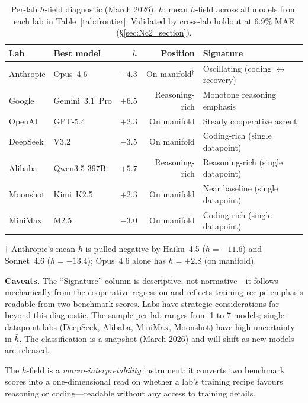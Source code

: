 \documentclass[11pt]{article}
\begin{document}
\begin{table}[ht]
\centering\small
\caption{Per-lab $h$-field diagnostic (March 2026).
$\bar{h}$: mean $h$-field across all models from each lab in Table~\ref{tab:frontier}. Validated by cross-lab holdout at 6.9\% MAE (\S\ref{sec:Nc2_section}).}
\label{tab:lab_diagnostic}
\begin{tabular}{llrrl}
\toprule
Lab & Best model & $\bar{h}$ & Position & Signature \\
\midrule
Anthropic & Opus~4.6     & $-4.3$  & On manifold$^\dagger$     & Oscillating (coding $\leftrightarrow$ recovery) \\
Google    & Gemini~3.1~Pro & $+6.5$ & Reasoning-rich  & Monotone reasoning emphasis \\
OpenAI    & GPT-5.4      & $+2.3$  & On manifold     & Steady cooperative ascent \\
DeepSeek  & V3.2         & $-3.5$  & On manifold     & Coding-rich (single datapoint) \\
Alibaba   & Qwen3.5-397B & $+5.7$  & Reasoning-rich  & Reasoning-rich (single datapoint) \\
Moonshot  & Kimi~K2.5    & $+2.3$  & On manifold     & Near baseline (single datapoint) \\
MiniMax   & M2.5         & $-3.0$  & On manifold     & Coding-rich (single datapoint) \\
\bottomrule
\end{tabular}
\end{table}
\noindent$\dagger$ Anthropic's mean $\bar{h}$ is pulled negative by Haiku~4.5 ($h=-11.6$) and Sonnet~4.6 ($h=-13.4$); Opus~4.6 alone has $h=+2.8$ (on manifold).

\noindent\textbf{Caveats.} The ``Signature'' column is descriptive, not normative---it follows mechanically from the cooperative regression and reflects training-recipe emphasis readable from two benchmark scores. Labs have strategic considerations far beyond this diagnostic. The sample per lab ranges from 1 to 7 models; single-datapoint labs (DeepSeek, Alibaba, MiniMax, Moonshot) have high uncertainty in $\bar{h}$. The classification is a snapshot (March 2026) and will shift as new models are released.

\noindent The $h$-field is a \emph{macro-interpretability} instrument: it converts two benchmark scores into a one-dimensional read on whether a lab's training recipe favours reasoning or coding---readable without any access to training details.
\end{document}
